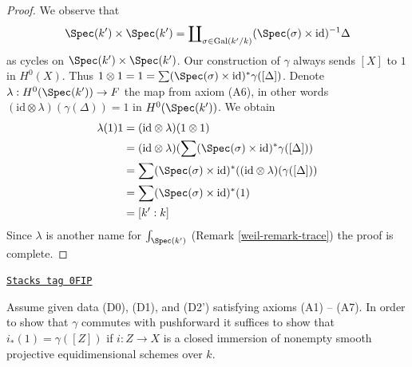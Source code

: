 \begin{proof}

We observe that
$$
\Spec(k') \times \Spec(k') =
\coprod\nolimits_{\sigma \in \text{Gal}(k'/k)}
(\Spec(\sigma) \times \text{id})^{-1} \Delta
$$
as cycles on $\Spec(k') \times \Spec(k')$.
Our construction of $\gamma$ always sends $[X]$ to $1$ in $H^0(X)$. Thus
$1 \otimes 1 = 1 = \sum (\Spec(\sigma) \times \text{id})^*\gamma([\Delta])$.
Denote $\lambda : H^0(\Spec(k')) \to F$ the map from
axiom (A6), in other words $(\text{id} \otimes \lambda)(\gamma(\Delta)) = 1$
in $H^0(\Spec(k'))$. We obtain
\begin{align*}
\lambda(1) 1
& =
(\text{id} \otimes \lambda)(1 \otimes 1) \\
& =
(\text{id} \otimes \lambda)(
\sum (\Spec(\sigma) \times \text{id})^*\gamma([\Delta])) \\
& =
\sum (\Spec(\sigma) \times \text{id})^*(
(\text{id} \otimes \lambda)(\gamma([\Delta])) \\
& =
\sum (\Spec(\sigma) \times \text{id})^*(1) \\
& =
[k' : k]
\end{align*}
Since $\lambda$ is another name for $\int_{\Spec(k')}$
(Remark \ref{weil-remark-trace}) the proof is complete.
\end{proof}

\begin{lemma}[Enough]
\label{weil-lemma-enough}
\href{https://stacks.math.columbia.edu/tag/0FIP}{\texttt{Stacks tag 0FIP}}

Assume given data (D0), (D1), and (D2') satisfying axioms (A1) -- (A7).
In order to show that $\gamma$ commutes with pushforward it suffices
to show that $i_*(1) = \gamma([Z])$ if $i : Z \to X$ is a closed
immersion of nonempty smooth projective equidimensional schemes over $k$.
\end{lemma}

